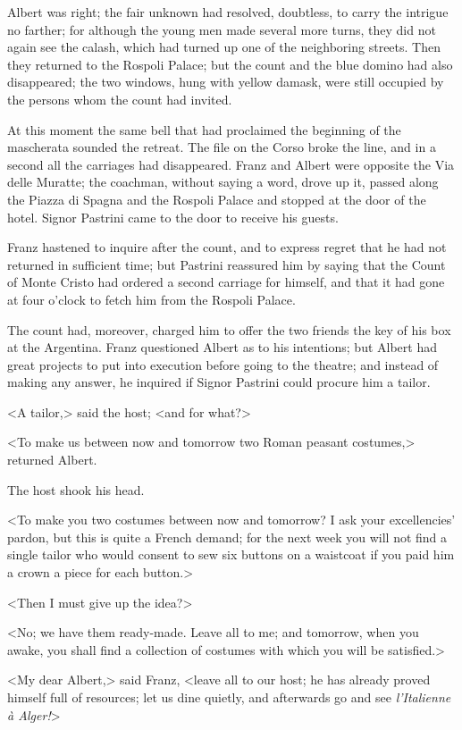  Albert was right; the fair unknown had resolved, doubtless, to carry the intrigue no farther; for although the young men made several more turns, they did not again see the calash, which had turned up one of the neighboring streets. Then they returned to the Rospoli Palace; but the count and the blue domino had also disappeared; the two windows, hung with yellow damask, were still occupied by the persons whom the count had invited. 

 At this moment the same bell that had proclaimed the beginning of the mascherata sounded the retreat. The file on the Corso broke the line, and in a second all the carriages had disappeared. Franz and Albert were opposite the Via delle Muratte; the coachman, without saying a word, drove up it, passed along the Piazza di Spagna and the Rospoli Palace and stopped at the door of the hotel. Signor Pastrini came to the door to receive his guests. 

 Franz hastened to inquire after the count, and to express regret that he had not returned in sufficient time; but Pastrini reassured him by saying that the Count of Monte Cristo had ordered a second carriage for himself, and that it had gone at four o'clock to fetch him from the Rospoli Palace. 

 The count had, moreover, charged him to offer the two friends the key of his box at the Argentina. Franz questioned Albert as to his intentions; but Albert had great projects to put into execution before going to the theatre; and instead of making any answer, he inquired if Signor Pastrini could procure him a tailor. 

 <A tailor,> said the host; <and for what?> 

 <To make us between now and tomorrow two Roman peasant costumes,> returned Albert. 

 The host shook his head. 

 <To make you two costumes between now and tomorrow? I ask your excellencies' pardon, but this is quite a French demand; for the next week you will not find a single tailor who would consent to sew six buttons on a waistcoat if you paid him a crown a piece for each button.> 

 <Then I must give up the idea?> 

 <No; we have them ready-made. Leave all to me; and tomorrow, when you awake, you shall find a collection of costumes with which you will be satisfied.> 

 <My dear Albert,> said Franz, <leave all to our host; he has already proved himself full of resources; let us dine quietly, and afterwards go and see \textit{l'Italienne à Alger!}>

